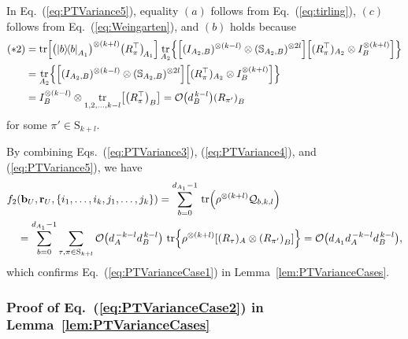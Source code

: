 \documentclass[aps,prl,twocolumn,nofootinbib,superscriptaddress,10pt]{revtex4-2}
\let\originalleft\left
\let\originalright\right
\renewcommand{\left}{\mathopen{}\mathclose\bgroup\originalleft}
\renewcommand{\right}{\aftergroup\egroup\originalright}
\newcommand{\ketbra}[2]{\ensuremath{\left|#1\right\rangle\!\left\langle#2\right|}}
\DeclareMathOperator{\Tr}{tr}
\newcommand{\bigo}[1]{\mathcal{O}\left(#1\right)}
\theoremstyle{plain}
\theoremstyle{definition}
\def\eqref#1{\textup{(\ref{#1})}}
\newcommand{\eref}[1]{Eq.~\textup{(\ref{#1})}}
\newcommand{\lref}[1]{Lemma~\ref{#1}}
\begin{document}
In \eref{eq:PTVariance5}, equality $(a)$ follows from \eref{eq:tirling}, $(c)$ follows from \eref{eq:Weingarten}, and $(b)$ holds because 
\begin{align}
(*2)
&= \Tr \left[\left( \ketbra{b}{b}_{A_1}\right)^{\otimes (k+l)}\left( R_{\pi}^{\top}\right)_{\!A_1}\right] 
\Tr_{A_2} \left\lbrace \left[ ( I_{A_2,B})^{\otimes (k-l)}\otimes ( \mathbb{S}_{A_2,B})^{\otimes 2l}\right]  \left[(R_{\pi}^{\top})_{A_2} \otimes I_B^{\otimes (k+l)} \right] \right\rbrace 
\nonumber\\
&= \Tr_{A_2} \left\lbrace \left[ ( I_{A_2,B})^{\otimes (k-l)}\otimes ( \mathbb{S}_{A_2,B})^{\otimes 2l}\right]  \left[(R_{\pi}^{\top})_{A_2} \otimes I_B^{\otimes (k+l)} \right] \right\rbrace 
\nonumber\\
&= I_B^{\otimes (k-l)} \otimes \Tr_{1,2,\dots,k-l}\left[ \left(R_\pi^\top \right)_B\right] 
= \bigo{d_B^{\,k-l}} \left(R_{\pi'} \right)_B
\end{align}
for some $\pi'\in \mathrm{S}_{k+l}$. 


By combining Eqs.~\eqref{eq:PTVariance3}, \eqref{eq:PTVariance4}, and \eqref{eq:PTVariance5}, we have
\begin{align}\label{eq:PTVariance6} 
&f_2\left( \mathbf{b}_{U},\mathbf{r}_{U},\left\lbrace i_1,\dots,i_k,j_1,\dots,j_k\right\rbrace \right)
= \sum_{b=0}^{d_{A_1}-1} \,\Tr \left( \rho^{\otimes (k+l)}\mathcal{Q}_{b,k,l}\right)
\nonumber\\
&\quad = \sum_{b=0}^{d_{A_1}-1} \sum_{\tau,\pi\in \mathrm{S}_{k+l}} \bigo{d_A^{\,-k-l} d_B^{\,k-l}} \, 
\Tr  \left\lbrace \rho^{\otimes (k+l)} \left[(R_{\tau})_A \otimes \left(R_{\pi'} \right)_B\right] \right\rbrace 
= \bigo{ d_{A_1} d_A^{\,-k-l} d_B^{\,k-l} } , 
\end{align}
which confirms \eref{eq:PTVarianceCase1} in \lref{lem:PTVarianceCases}.



\subsubsection{Proof of \eref{eq:PTVarianceCase2} in \lref{lem:PTVarianceCases}}
\end{document}
